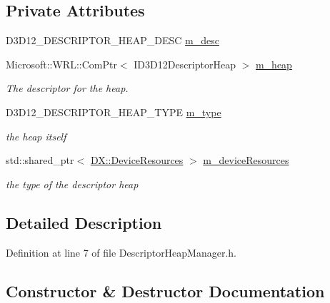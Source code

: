 \subsection*{Private Attributes}
\begin{DoxyCompactItemize}
\item 
D3\+D12\+\_\+\+D\+E\+S\+C\+R\+I\+P\+T\+O\+R\+\_\+\+H\+E\+A\+P\+\_\+\+D\+E\+SC \mbox{\hyperlink{class_descriptor_heap_manager_a09cfe4f8f94bb9d12b441132fb53a95e}{m\+\_\+desc}}
\item 
Microsoft\+::\+W\+R\+L\+::\+Com\+Ptr$<$ I\+D3\+D12\+Descriptor\+Heap $>$ \mbox{\hyperlink{class_descriptor_heap_manager_a373ccb68b5f147346d24469f8b46e2f4}{m\+\_\+heap}}
\begin{DoxyCompactList}\small\item\em The descriptor for the heap. \end{DoxyCompactList}\item 
D3\+D12\+\_\+\+D\+E\+S\+C\+R\+I\+P\+T\+O\+R\+\_\+\+H\+E\+A\+P\+\_\+\+T\+Y\+PE \mbox{\hyperlink{class_descriptor_heap_manager_a97dc1db0ffbcb980be70180fdd3e97dd}{m\+\_\+type}}
\begin{DoxyCompactList}\small\item\em the heap itself \end{DoxyCompactList}\item 
std\+::shared\+\_\+ptr$<$ \mbox{\hyperlink{class_d_x_1_1_device_resources}{D\+X\+::\+Device\+Resources}} $>$ \mbox{\hyperlink{class_descriptor_heap_manager_a6a5e1513f7c9b6ba048796882e16de01}{m\+\_\+device\+Resources}}
\begin{DoxyCompactList}\small\item\em the type of the descriptor heap \end{DoxyCompactList}\end{DoxyCompactItemize}


\subsection{Detailed Description}


Definition at line 7 of file Descriptor\+Heap\+Manager.\+h.



\subsection{Constructor \& Destructor Documentation}
\mbox{\label{class_descriptor_heap_manager_a0f9384d42ee90d6207e64b0b8f24123b}} 
